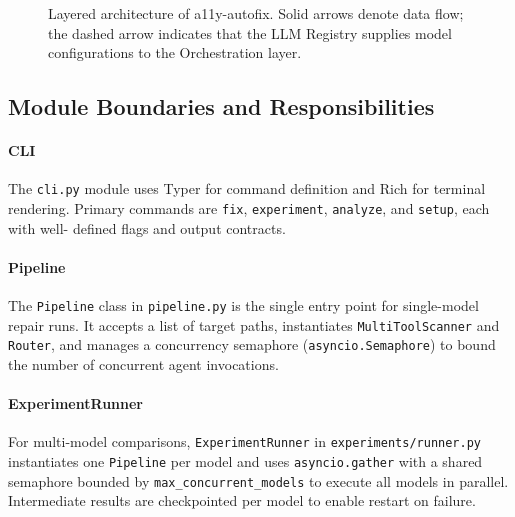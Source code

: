 \documentclass[10pt,conference]{IEEEtran}
\begin{document}
\begin{figure}[htbp]
\caption{Layered architecture of a11y-autofix.  Solid arrows denote data
  flow; the dashed arrow indicates that the LLM Registry supplies model
  configurations to the Orchestration layer.}
\label{fig:arch}
\end{figure}

\subsection{Module Boundaries and Responsibilities}

\paragraph{CLI} The \texttt{cli.py} module uses Typer for command definition
and Rich for terminal rendering.  Primary commands are \texttt{fix},
\texttt{experiment}, \texttt{analyze}, and \texttt{setup}, each with well-
defined flags and output contracts.

\paragraph{Pipeline} The \texttt{Pipeline} class in \texttt{pipeline.py} is
the single entry point for single-model repair runs.  It accepts a list of
target paths, instantiates \texttt{MultiToolScanner} and \texttt{Router},
and manages a concurrency semaphore (\texttt{asyncio.Semaphore}) to bound
the number of concurrent agent invocations.

\paragraph{ExperimentRunner} For multi-model comparisons,
\texttt{ExperimentRunner} in \texttt{experiments/runner.py} instantiates one
\texttt{Pipeline} per model and uses \texttt{asyncio.gather} with a shared
semaphore bounded by \texttt{max\_concurrent\_models} to execute all models in
parallel.  Intermediate results are checkpointed per model to enable restart
on failure.
\end{document}

